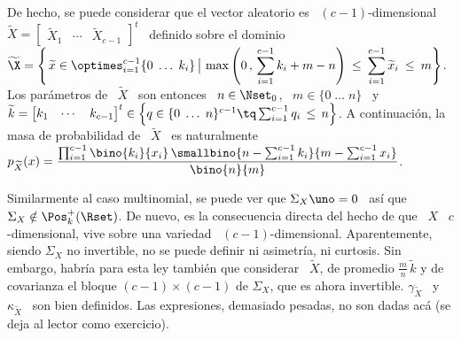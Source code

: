 De hecho, se puede considerar que el vector aleatorio es \ $(c-1)$-dimensional \
$\widetilde{X}     =    \begin{bmatrix}     \widetilde{X}_1    &     \cdots    &
  \widetilde{X}_{c-1}   \end{bmatrix}^t$   \  definido   sobre   el  dominio   \
$\displaystyle    \widetilde{\X}   =    \left\{    \left.   \widetilde{x}    \in
    \optimes_{i=1}^{c-1} \{ 0 \; \ldots \; k_i\} \, \right| \, \max\left( 0 \, ,
    \,  \sum_{i=1}^{c-1}  k_i  +  m  -  n \right)  \:  \le  \:  \sum_{i=1}^{c-1}
  \widetilde{x}_i \: \le \: m \right\}$. Los par\'ametros de \ $\widetilde{X}$ \
son  entonces \  $n \in  \Nset_0$, \  $m \in  \{  0 \;  \ldots \;  n \}$  \ y  \
$\widetilde{k}     =     \protect\begin{bmatrix}      k_1     &     \cdots     &
  k_{c-1} \end{bmatrix}^t\protect \in \left\{ q \in \{ 0 \; \ldots \; n \}^{c-1}
  \tq \sum_{i=1}^{c-1} q_i  \, \le \, n \right\}$. A  continuaci\'on, la masa de
probabilidad   de  \   $\widetilde{X}$  \   es  naturalmente   \  $\displaystyle
p_{\widetilde{X}}(x)  =  \frac{\prod_{i=1}^{c-1} \bino{k_i\vspace{1mm}}{x_i}  \,
  \smallbino{n   -   \sum_{i=1}^{c-1}   k_i\vspace{2mm}}{m  -   \sum_{i=1}^{c-1}
    x_i}}{\bino{n}{m}}$.

Similarmente al  caso multinomial, se puede ver  que $\Sigma_X \uno =  0$ \ as\'i
que \ $\Sigma_X \notin \Pos_k^+(\Rset)$.  De nuevo, es la consecuencia directa del
hecho   de  que   \  $X$   \  $c$-dimensional,   vive  sobre   una   variedad  \
$(c-1)$-dimensional. Aparentemente, siendo $\Sigma_X$ no invertible, no se puede
definir  ni  asimetr\'ia, ni  curtosis.  Sin  embargo,  habr\'ia para  esta  ley
tambi\'en  que  considerar  \   $\widetilde{X}$,  de  promedio  $\frac{m}{n}  \,
\widetilde{k}$ y de covarianza el bloque $(c-1) \times (c-1)$ de $\Sigma_X$, que
es ahora  invertible. $\gamma_{\widetilde{X}}$ \ y  \ $\kappa_{\widetilde{X}}$ \
son bien definidos.  Las expresiones, demasiado pesadas, no  son dadas ac\'a (se
deja al lector como exercicio).


\SZ{Ver si se calcula Phi}

